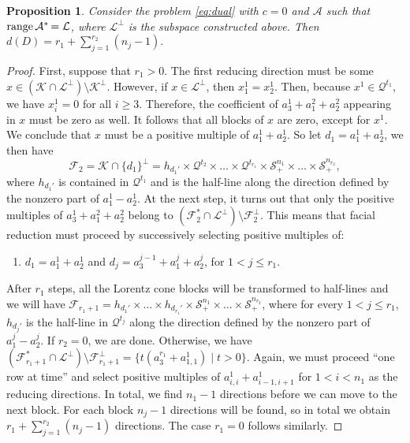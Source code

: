 \documentclass{article}
\newcommand{\SOC}[1]{{\mathcal{Q}^{#1}}}
\newcommand{\PSDcone}[1]{{\mathcal{S}^{#1}_+}}
\newcommand{\stdMap}{ {\mathcal{A}}}
\newcommand{\stdCone}{ {\mathcal{K}}}
\newcommand{\stdSpace}{ \mathcal{L}}
\newcommand{\stdFace}{ \mathcal{F}}
\newcommand{\matRange}{{\mathrm{ range } \,}}
\newcommand{\T}{\ast\hspace{-1pt}}
\newtheorem{proposition}[definition]{Proposition}
\begin{document}
\begin{proposition}\label{prop:worst_bound}
Consider the problem \eqref{eq:dual} with $c = 0$ and $\stdMap$ such that $ \matRange \stdMap^\T = \stdSpace$, where $\stdSpace ^\perp$ is 	the subspace constructed above. Then 
	$
	d(D) =	 r_1 + \sum _{j = 1}^{r_2} (n_j  - 1).
	$
\end{proposition}
\begin{proof}
	First, suppose that $r_1 > 0$.
	The first reducing direction must be some  $x \in (\stdCone \cap \stdSpace^\perp )\setminus \stdCone^\perp$. However, if $x \in \stdSpace^\perp$,
	then 	$x^1_1 = x^1_2$. Then, because $x^1 \in \SOC{t_1}$, we have 
	$x^1_i = 0$ for all $i\geq 3$.  Therefore, the coefficient of $a^{1}_3 + a^2_{1} + a^2_{2}$ appearing 
	in $x$ must be zero as well. It follows that all  blocks of $x$ are zero, 
	except for $x^1$. We conclude that $x$ must be a positive multiple of $ a^1_{1} + a^1_{2}$. So let $d_1 = a^1_{1} + a^1_{2}$, we then have 
	$$\stdFace _2 = \stdCone \cap \{d_1\}^\perp = h_{d_1'} \times \SOC{t_{2}} \times \ldots \times \SOC{t_{r_1}} \times \PSDcone{n_1}  \times \ldots \times \PSDcone{n_{r_2}}, $$
	where $h_{d_1'}$ is contained in $\SOC{t_1}$ and is the half-line along the direction defined by the nonzero part of $a^1_{1} - a^1_{2}$.
At the next step, it turns out that only the positive multiples 
	of $a^{1}_3 + a^2_{1} + a^2_{2}$ belong to $(\stdFace _2^* \cap \stdSpace^\perp) \setminus \stdFace _2^\perp $. This means 
	that facial reduction must proceed by successively selecting  positive multiples of:
	\begin{enumerate}
		\item $d_1 = a^1_{1} + a^1_{2}$ and $d_j = a^{j-1}_3 + a^j_{1} + a^j_{2}$, for $1 < j \leq r_1$.
	\end{enumerate}
	After $r_1$ steps, all the Lorentz cone blocks will be transformed to half-lines 
	and we will have $\stdFace _{r_1+1} =  h_{d_1'} \times \ldots \times h_{d_{r_1}'} \times \PSDcone{n_1}  \times \ldots \times \PSDcone{n_{r_2}} $, 
	where for every $1 < j \leq r_1 $, $h_{d_j'}$ is the half-line in $\SOC{t_j}$ along the direction defined by the nonzero part of $a^j_{1} - a^j_{2}$. 	If $r_2 = 0$, we are done.
	Otherwise, we  have $(\stdFace _{r_1+1}^*\cap \stdSpace ^\perp)\setminus \stdFace _{r_1+1}^\perp  = \{t(a^{r_1}_3 + a^1_{1,1}) \mid t > 0 \}$.
	Again, we must proceed ``one row at time'' and select positive multiples of 
	$a^{1}_{i,i} + a^{1}_{i-1,i+1}$ for  $1 < i < n_1$ as the reducing directions. In total, we find $n_1 - 1$ directions before we can move to the next block. For each block 
	$n_j -1$ directions will be found, so in total we obtain $r_1 + \sum _{j = 1}^{r_2} (n_j  - 1)$
	directions. 	The case $r_1 = 0$ follows similarly.
\end{proof}
\end{document}
